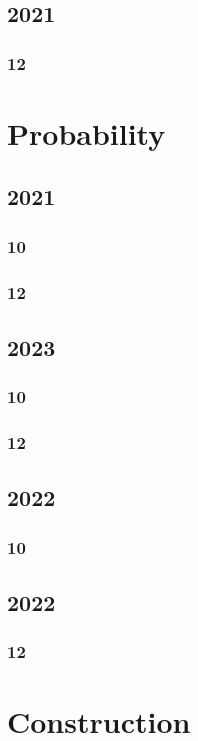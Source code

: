 \documentclass[11pt]{book}
\begin{document}
\section{2021}
\subsection{12}

\chapter{Probability}
\section{2021}
\subsection{10}

\subsection{12}

\section{2023}
\subsection{10}

\subsection{12}

\section{2022}
\subsection{10}

\section{2022}
\subsection{12}

\chapter{Construction}

\end{document}
